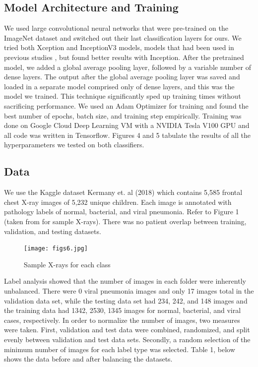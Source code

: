 \documentclass[conference]{IEEEtran}
\begin{document}
\subsection{Model Architecture and Training}
We used large convolutional neural networks that were pre-trained on the ImageNet dataset and switched out their last classification layers for ours. We tried both Xception and InceptionV3 models, models that had been used in previous studies \cite{retinopathy} \cite{kermany2018identifying}, but found better results with Inception. After the pretrained model, we added a global average pooling layer, followed by a variable number of dense layers. The output after the global average pooling layer was saved and loaded in a separate model comprised only of dense layers, and this was the model we trained. This technique significantly sped up training times without sacrificing performance. We used an Adam Optimizer for training and found the best number of epochs, batch size, and training step empirically. Training was done on Google Cloud Deep Learning VM with a NVIDIA Tesla V100 GPU and all code was written in Tensorflow. Figures 4 and 5 tabulate the results of all the hyperparameters we tested on both classifiers.

\subsection{Data}
We use the Kaggle dataset Kermany et. al (2018) \cite{kermany2018identifying} which contains 5,585 frontal chest X-ray images of 5,232 unique children. Each image is annotated with pathology labels of normal, bacterial, and viral pneumonia. Refer to Figure 1 (taken from \cite{kermany2018identifying} for sample X-rays). There was no patient overlap between training, validation, and testing datasets.

\begin{figure}[htbp]
\centerline{\texttt{[image: figs6.jpg]}}
\caption{Sample X-rays for each class \cite{kermany2018identifying}}
\label{fig}
\end{figure}

Label analysis showed that the number of images in each folder were inherently unbalanced. There were 0 viral pneumonia images and only 17 images total in the validation data set, while the testing data set had 234, 242, and 148 images and the training data had 1342, 2530, 1345 images for normal, bacterial, and viral cases, respectively. In order to normalize the number of images, two measures were taken. First, validation and test data were combined, randomized, and split evenly between validation and test data sets. Secondly, a random selection of the minimum number of images for each label type was selected. Table 1, below shows the data before and after balancing the datasets.
\end{document}
